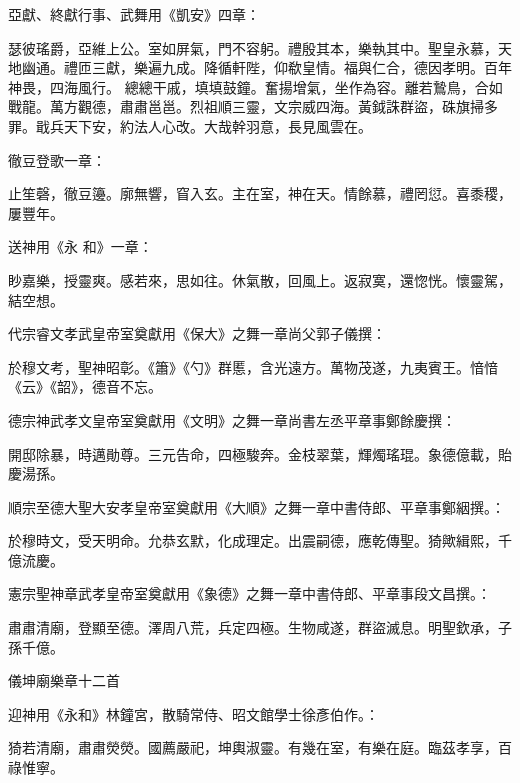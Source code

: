 \begin{pinyinscope}
 亞獻、終獻行事、武舞用《凱安》四章：



 瑟彼瑤爵，亞維上公。室如屏氣，門不容躬。禮殷其本，樂執其中。聖皇永慕，天地幽通。禮匝三獻，樂遍九成。降循軒陛，仰欷皇情。福與仁合，德因孝明。百年神畏，四海風行。
 總總干戚，填填鼓鐘。奮揚增氣，坐作為容。離若鷙鳥，合如戰龍。萬方觀德，肅肅邕邕。烈祖順三靈，文宗威四海。黃鉞誅群盜，硃旗掃多罪。戢兵天下安，約法人心改。大哉幹羽意，長見風雲在。



 徹豆登歌一章：



 止笙磬，徹豆籩。廓無響，窅入玄。主在室，神在天。情餘慕，禮罔愆。喜黍稷，屢豐年。



 送神用《永
 和》一章：



 眇嘉樂，授靈爽。感若來，思如往。休氣散，回風上。返寂寞，還惚恍。懷靈駕，結空想。



 代宗睿文孝武皇帝室奠獻用《保大》之舞一章尚父郭子儀撰：



 於穆文考，聖神昭彰。《簫》《勺》群慝，含光遠方。萬物茂遂，九夷賓王。愔愔《云》《韶》，德音不忘。



 德宗神武孝文皇帝室奠獻用《文明》之舞一章尚書左丞平章事鄭餘慶撰：



 開邸除暴，時邁勛尊。三元告命，四極駿奔。金枝翠葉，輝燭瑤琨。象德億載，貽慶湯孫。



 順宗至德大聖大安孝皇帝室奠獻用《大順》之舞一章中書侍郎、平章事鄭絪撰。：



 於穆時文，受天明命。允恭玄默，化成理定。出震嗣德，應乾傳聖。猗歟緝熙，千億流慶。



 憲宗聖神章武孝皇帝室奠獻用《象德》之舞一章中書侍郎、平章事段文昌撰。：



 肅肅清廟，登顯至德。澤周八荒，兵定四極。生物咸遂，群盜滅息。明聖欽承，子孫千億。



 儀坤廟樂章十二首



 迎神用《永和》林鐘宮，散騎常侍、昭文館學士徐彥伯作。：



 猗若清廟，肅肅熒熒。國薦嚴祀，坤輿淑靈。有幾在室，有樂在庭。臨茲孝享，百祿惟寧。




\end{pinyinscope}
